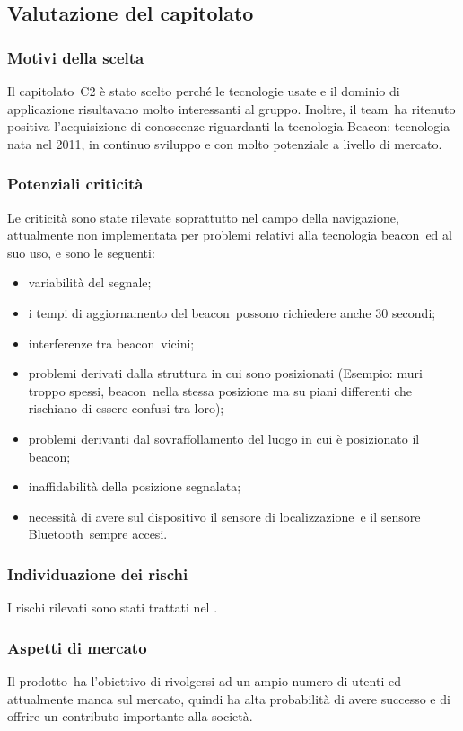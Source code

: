 \documentclass[../StudioDiFattibilita.tex]{subfiles}
\begin{document}
	\subsection{Valutazione del capitolato}
		\subsubsection{Motivi della scelta}
		Il capitolato\g\ C2 è stato scelto perché le tecnologie usate e il dominio di applicazione risultavano molto interessanti al gruppo.
		Inoltre, il team\g\ ha ritenuto positiva l'acquisizione di conoscenze riguardanti la tecnologia Beacon\g: tecnologia nata nel 2011, in continuo sviluppo e con molto potenziale a livello di mercato.
		\subsubsection{Potenziali criticità}
		Le criticità sono state rilevate soprattutto nel campo della navigazione, attualmente non implementata per problemi relativi alla tecnologia beacon\g\ ed al suo uso, e sono le seguenti:
			\begin{itemize}
				\item variabilità del segnale;
				\item i tempi di aggiornamento del beacon\g\ possono richiedere anche 30 secondi;
				\item interferenze tra beacon\g\ vicini;
				\item problemi derivati dalla struttura in cui sono posizionati (Esempio: muri troppo spessi, beacon\g\ nella stessa posizione ma su piani differenti che rischiano di essere confusi tra loro);
				\item problemi derivanti dal sovraffollamento del luogo in cui è posizionato il beacon\g;
				\item inaffidabilità della posizione segnalata;
				\item necessità di avere sul dispositivo il sensore di localizzazione\g\ e il sensore Bluetooth\g\ sempre accesi.
			\end{itemize}
		\subsubsection{Individuazione dei rischi}
		I rischi rilevati sono stati trattati nel \pianodiprogettov.
		\subsubsection{Aspetti di mercato}
		Il prodotto\g\ ha l'obiettivo di rivolgersi ad un ampio numero di utenti ed attualmente manca sul mercato, quindi ha alta probabilità di avere successo e di offrire un contributo importante alla società.
\end{document}
